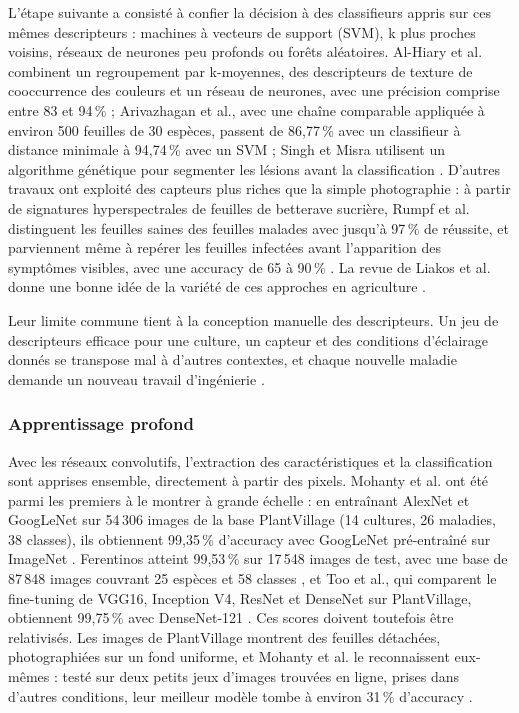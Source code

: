 L'étape suivante a consisté à confier la décision à des classifieurs appris sur ces mêmes descripteurs : machines à vecteurs de support (SVM), k plus proches voisins, réseaux de neurones peu profonds ou forêts aléatoires. Al-Hiary et al. combinent un regroupement par k-moyennes, des descripteurs de texture de cooccurrence des couleurs et un réseau de neurones, avec une précision comprise entre 83 et 94\,\% \cite{alhiary2011fast} ; Arivazhagan et al., avec une chaîne comparable appliquée à environ 500 feuilles de 30 espèces, passent de 86,77\,\% avec un classifieur à distance minimale à 94,74\,\% avec un SVM \cite{arivazhagan2013detection} ; Singh et Misra utilisent un algorithme génétique pour segmenter les lésions avant la classification \cite{singh2017detection}. D'autres travaux ont exploité des capteurs plus riches que la simple photographie : à partir de signatures hyperspectrales de feuilles de betterave sucrière, Rumpf et al. distinguent les feuilles saines des feuilles malades avec jusqu'à 97\,\% de réussite, et parviennent même à repérer les feuilles infectées avant l'apparition des symptômes visibles, avec une accuracy de 65 à 90\,\% \cite{rumpf2010early}. La revue de Liakos et al. donne une bonne idée de la variété de ces approches en agriculture \cite{liakos2018ml}.

Leur limite commune tient à la conception manuelle des descripteurs. Un jeu de descripteurs efficace pour une culture, un capteur et des conditions d'éclairage donnés se transpose mal à d'autres contextes, et chaque nouvelle maladie demande un nouveau travail d'ingénierie \cite{barbedo2016review, mahlein2016plant}.

\subsubsection{Apprentissage profond}

Avec les réseaux convolutifs, l'extraction des caractéristiques et la classification sont apprises ensemble, directement à partir des pixels. Mohanty et al. ont été parmi les premiers à le montrer à grande échelle : en entraînant AlexNet et GoogLeNet sur 54\,306 images de la base PlantVillage \cite{hughes2015plantvillage} (14 cultures, 26 maladies, 38 classes), ils obtiennent 99,35\,\% d'accuracy avec GoogLeNet pré-entraîné sur ImageNet \cite{mohanty2016using}. Ferentinos atteint 99,53\,\% sur 17\,548 images de test, avec une base de 87\,848 images couvrant 25 espèces et 58 classes \cite{ferentinos2018deep}, et Too et al., qui comparent le fine-tuning de VGG16, Inception V4, ResNet et DenseNet sur PlantVillage, obtiennent 99,75\,\% avec DenseNet-121 \cite{too2019comparative}. Ces scores doivent toutefois être relativisés. Les images de PlantVillage montrent des feuilles détachées, photographiées sur un fond uniforme, et Mohanty et al. le reconnaissent eux-mêmes : testé sur deux petits jeux d'images trouvées en ligne, prises dans d'autres conditions, leur meilleur modèle tombe à environ 31\,\% d'accuracy \cite{mohanty2016using}.

